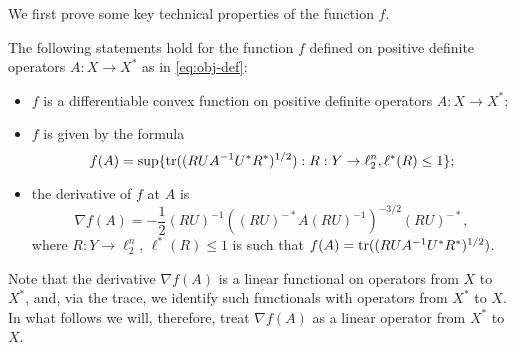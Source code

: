 We first prove some key technical properties of the function $f$.
\begin{lemma}\label{lm:obj-f}
  The following statements hold for the function $f$ defined on
  positive definite operators $A:X \to X^*$ as in \eqref{eq:obj-def}:
 \begin{itemize}
  \item $f$ is a differentiable convex function on positive definite
    operators $A:X \to X^*$;
  \item $f$ is given by the formula
    \begin{equation}\label{eq:f-formula}
    f(A) = \sup\{\operatorname{tr}((RUA^{-1}U^*R^*)^{1/2}): 
    R: Y \to \ell_2^n, \ell^*(R) \le 1\};
    \end{equation}
  \item the derivative of $f$ at $A$ is 
    \begin{equation}\label{eq:f-derivative}
    \nabla f(A) = 
    -\frac{1}{2} (RU)^{-1} ((RU)^{-*} A (RU)^{-1})^{-3/2} (RU)^{-*},
    \end{equation}
    where $R: Y \to \ell_2^n$, $\ell^*(R) \le 1$ is such that $f(A) = 
    \operatorname{tr}((RUA^{-1}U^*R^*)^{1/2})$.
  \end{itemize}
\end{lemma}
Note that the derivative $\nabla f(A)$ is a linear functional on
operators from $X$ to $X^*$, and, via the trace, we identify such functionals with
operators from $X^*$ to $X$. In what follows we will, therefore, treat $\nabla
f(A)$ as a linear operator from $X^*$ to $X$.

